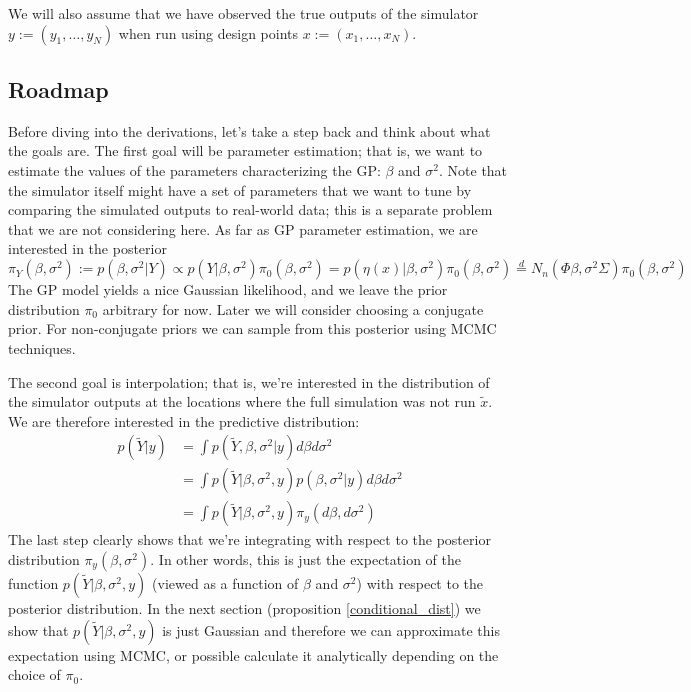 \documentclass[12pt]{article}
\begin{document}
We will also assume that we have observed the true outputs of the simulator $y := (y_1, \dots, y_N)$ when run using design points $x := (x_1, \dots, x_N)$.

\subsection{Roadmap}
Before diving into the derivations, let's take a step back and think about what the goals are. The first goal will be parameter estimation; that is, we want to estimate the values of 
the parameters characterizing the GP: $\beta$ and $\sigma^2$. Note that the simulator itself might have a set of parameters that we want to tune by comparing the simulated outputs 
to real-world data; this is a separate problem that we are not considering here. As far as GP parameter estimation, we are interested in the posterior 
\[\pi_Y(\beta, \sigma^2) := p(\beta, \sigma^2|Y) \propto p(Y|\beta, \sigma^2)\pi_0(\beta, \sigma^2) = p(\eta(x)|\beta, \sigma^2)\pi_0(\beta, \sigma^2) \overset{d}{=} N_n(\Phi \beta, \sigma^2 \Sigma)\pi_0(\beta, \sigma^2) \]
The GP model yields a nice Gaussian likelihood, and we leave the prior distribution $\pi_0$ arbitrary for now. Later we will consider choosing a conjugate prior. For non-conjugate priors we can 
sample from this posterior using MCMC techniques. 

The second goal is interpolation; that is, we're interested in the distribution of the simulator outputs at the locations where the full simulation was not run $\tilde{x}$. We are therefore interested in 
the predictive distribution: 
\begin{align*}
p(\tilde{Y}|y) &= \int p(\tilde{Y}, \beta, \sigma^2|y) d\beta d\sigma^2 \\
		    &= \int p(\tilde{Y}|\beta, \sigma^2, y)p(\beta, \sigma^2|y) d\beta d\sigma^2 \\
		    &= \int p(\tilde{Y}|\beta, \sigma^2, y) \pi_y(d\beta, d\sigma^2)
\end{align*}
The last step clearly shows that we're integrating with respect to the posterior distribution $\pi_y(\beta, \sigma^2)$. In other words, this is just the expectation of the function
$p(\tilde{Y}|\beta, \sigma^2, y)$ (viewed as a function of $\beta$ and $\sigma^2$) with respect to the posterior distribution. In the next section (proposition \ref{conditional_dist})
we show that $p(\tilde{Y}|\beta, \sigma^2, y)$ is just Gaussian and therefore we can approximate this expectation using MCMC, or possible calculate it analytically depending on the 
choice of $\pi_0$. 
\end{document}
